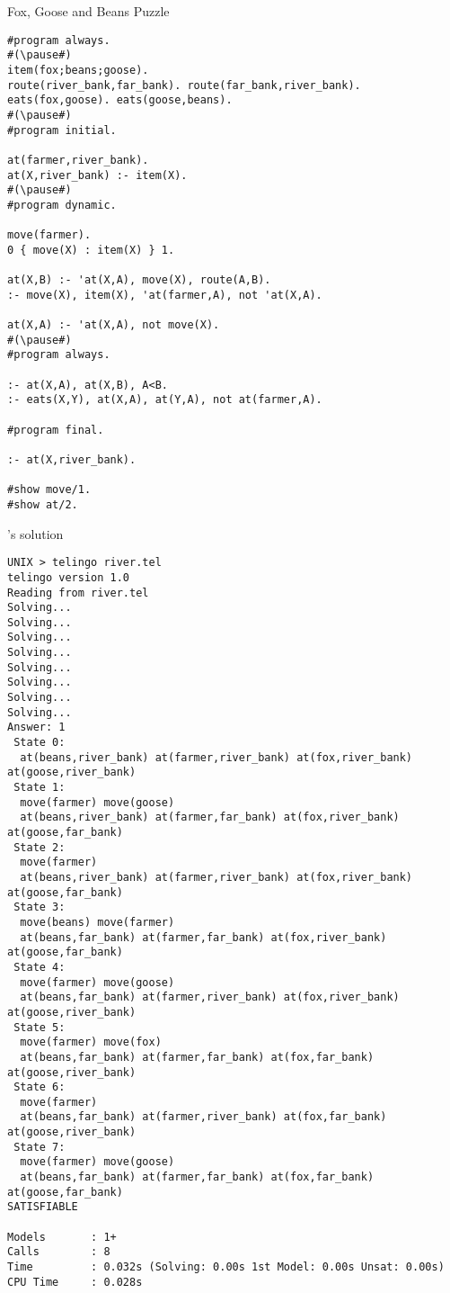 \begin{frame}{Fox, Goose and Beans Puzzle}
\pause
\begin{lstlisting}[numbers=none,frame=none,basicstyle=\ttfamily]
#program always.
#(\pause#)
item(fox;beans;goose).
route(river_bank,far_bank). route(far_bank,river_bank).
eats(fox,goose). eats(goose,beans).
#(\pause#)
#program initial.

at(farmer,river_bank).
at(X,river_bank) :- item(X).
#(\pause#)
#program dynamic.

move(farmer).
0 { move(X) : item(X) } 1.

at(X,B) :- 'at(X,A), move(X), route(A,B).
:- move(X), item(X), 'at(farmer,A), not 'at(X,A).

at(X,A) :- 'at(X,A), not move(X).
#(\pause#)
#program always.

:- at(X,A), at(X,B), A<B.
:- eats(X,Y), at(X,A), at(Y,A), not at(farmer,A).

#program final.

:- at(X,river_bank).

#show move/1.
#show at/2.
\end{lstlisting}
\end{frame}
\begin{frame}{\telingo's solution}
\begin{lstlisting}[numbers=none,frame=none,basicstyle=\ttfamily]
UNIX > telingo river.tel
telingo version 1.0
Reading from river.tel
Solving...
Solving...
Solving...
Solving...
Solving...
Solving...
Solving...
Solving...
Answer: 1
 State 0:
  at(beans,river_bank) at(farmer,river_bank) at(fox,river_bank) at(goose,river_bank)
 State 1:
  move(farmer) move(goose)
  at(beans,river_bank) at(farmer,far_bank) at(fox,river_bank) at(goose,far_bank)
 State 2:
  move(farmer)
  at(beans,river_bank) at(farmer,river_bank) at(fox,river_bank) at(goose,far_bank)
 State 3:
  move(beans) move(farmer)
  at(beans,far_bank) at(farmer,far_bank) at(fox,river_bank) at(goose,far_bank)
 State 4:
  move(farmer) move(goose)
  at(beans,far_bank) at(farmer,river_bank) at(fox,river_bank) at(goose,river_bank)
 State 5:
  move(farmer) move(fox)
  at(beans,far_bank) at(farmer,far_bank) at(fox,far_bank) at(goose,river_bank)
 State 6:
  move(farmer)
  at(beans,far_bank) at(farmer,river_bank) at(fox,far_bank) at(goose,river_bank)
 State 7:
  move(farmer) move(goose)
  at(beans,far_bank) at(farmer,far_bank) at(fox,far_bank) at(goose,far_bank)
SATISFIABLE

Models       : 1+
Calls        : 8
Time         : 0.032s (Solving: 0.00s 1st Model: 0.00s Unsat: 0.00s)
CPU Time     : 0.028s
\end{lstlisting}
\end{frame}

